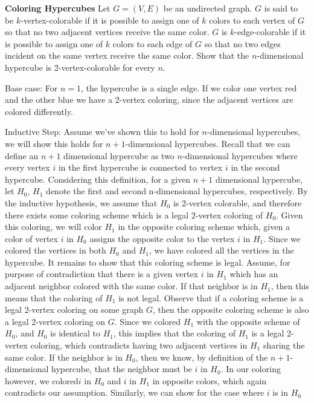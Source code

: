 \question \textbf{Coloring Hypercubes} \newline Let $G = (V, E)$ be 
an undirected graph. $G$ is said to be $k$-vertex-colorable if it is 
possible to assign one of $k$ colors to each vertex of $G$ so that no 
two adjacent vertices receive the same color. $G$ is $k$-edge-colorable 
if it is possible to assign one of $k$ colors to each edge of $G$ so 
that no two edges incident on the same vertex receive the same color. \newline
Show that the $n$-dimensional hypercube is 2-vertex-colorable for 
every $n$.
\begin{solution}[3in]
Base case: For $n = 1$, the hypercube is a single edge. If we color 
one vertex red and the other blue we have a 2-vertex coloring, since 
the adjacent vertices are colored differently. 

Inductive Step: Assume we’ve shown this to hold for $n$-dimensional 
hypercubes, we will show this holds for $n + 1$-dimensional hypercubes. 
Recall that we can define an $n + 1$ dimensional hypercube as two 
$n$-dimensional hypercubes where every vertex $i$ in the first 
hypercube is connected to vertex $i$ in the second hypercube. 
Considering this definition, for a given $n + 1$ dimensional 
hypercube, let $H_0$, $H_1$ denote the first and second n-dimensional 
hypercubes, respectively. By the inductive hypothesis, we assume that 
$H_0$ is 2-vertex colorable, and therefore there exists some coloring 
scheme which is a legal 2-vertex coloring of $H_0$. Given this coloring, 
we will color $H_1$ in the opposite coloring scheme which, given a color 
of vertex $ i$ in $H_0$ assigns the opposite color to the vertex $i$ in 
$H_1$. Since we colored the vertices in both $H_0$ and $H_1$, we have 
colored all the vertices in the hypercube. It remains to show that this coloring scheme is legal. Assume, for purpose of contradiction that there is a given 
vertex $i$ in $H_1$ which has an adjacent neighbor colored with the 
same color. If that neighbor is in $H_1$, then this means that the 
coloring of $H_1$ is not legal. Observe that if a coloring scheme is 
a legal 2-vertex coloring on some graph $G$, then the opposite 
coloring scheme is also a legal 2-vertex coloring on $G$. Since we 
colored $H_1$ with the opposite scheme of $H_0$, and $H_0$ is identical 
to $H_1$, this implies that the coloring of $H_1$ is a legal 2-vertex 
coloring, which contradicts having two adjacent vertices in $H_1$ 
sharing the same color. If the neighbor is in $H_0$, then we know, 
by definition of the $n + 1$-dimensional hypercube, that the neighbor 
must be $i$ in $H_0$. In our coloring however, we colored$ i$ in $H_0$ 
and $i$ in $H_1$ in opposite colors, which again contradicts our 
assumption. Similarly, we can show for the case where $i$ is in $H_0$
\end{solution}